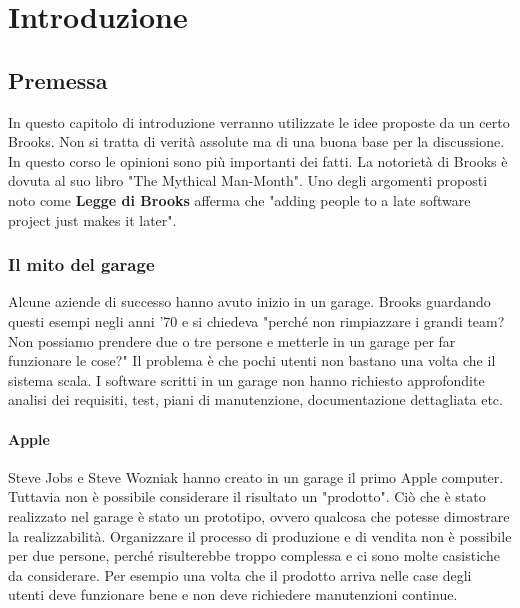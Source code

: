 \section{Introduzione}
\subsection{Premessa}
In questo capitolo di introduzione verranno utilizzate le idee proposte da un certo Brooks. Non si tratta di verità assolute ma di una buona base per la discussione. In questo corso le opinioni sono più importanti dei fatti.\newline
La notorietà di Brooks è dovuta al suo libro "The Mythical Man-Month". Uno degli argomenti proposti noto come \textbf{Legge di Brooks} afferma che "adding people to a late software project just makes it later".
\subsubsection{Il mito del garage}
Alcune aziende di successo hanno avuto inizio in un garage.\newline
Brooks guardando questi esempi negli anni '70 e si chiedeva "perché non rimpiazzare i grandi team? Non possiamo prendere due o tre persone e metterle in un garage per far funzionare le cose?"\newline
Il problema è che pochi utenti non bastano una volta che il sistema scala. I software scritti in un garage non hanno richiesto approfondite analisi dei requisiti, test, piani di manutenzione, documentazione dettagliata etc.
\paragraph{Apple}
Steve Jobs e Steve Wozniak hanno creato in un garage il primo Apple computer. Tuttavia non è possibile considerare il risultato un "prodotto". Ciò che è stato realizzato nel garage è stato un prototipo, ovvero qualcosa che potesse dimostrare la realizzabilità. Organizzare il processo di produzione e di vendita non è possibile per due persone, perché risulterebbe troppo complessa e ci sono molte casistiche da considerare.\newline
Per esempio una volta che il prodotto arriva nelle case degli utenti deve funzionare bene e non deve richiedere manutenzioni continue.
